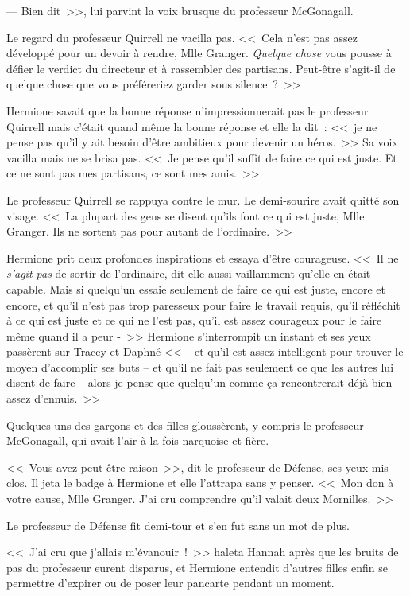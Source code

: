 --- Bien dit~>>, lui parvint la voix brusque du professeur McGonagall.

Le regard du professeur Quirrell ne vacilla pas. <<~Cela n'est pas assez développé pour un devoir à rendre, Mlle Granger. \emph{Quelque chose} vous pousse à défier le verdict du directeur et à rassembler des partisans. Peut-être s'agit-il de quelque chose que vous préféreriez garder sous silence~?~>>

Hermione savait que la bonne réponse n'impressionnerait pas le professeur Quirrell mais c'était quand même la bonne réponse et elle la dit~: <<~je ne pense pas qu'il y ait besoin d'être ambitieux pour devenir un héros.~>> Sa voix vacilla mais ne se brisa pas. <<~Je pense qu'il suffit de faire ce qui est juste. Et ce ne sont pas mes partisans, ce sont mes amis.~>>

Le professeur Quirrell se rappuya contre le mur. Le demi-sourire avait quitté son visage. <<~La plupart des gens se disent qu'ils font ce qui est juste, Mlle Granger. Ils ne sortent pas pour autant de l'ordinaire.~>>

Hermione prit deux profondes inspirations et essaya d'être courageuse. <<~Il ne \emph{s'agit pas} de sortir de l'ordinaire, dit-elle aussi vaillamment qu'elle en était capable. Mais si quelqu'un essaie seulement de faire ce qui est juste, encore et encore, et qu'il n'est pas trop paresseux pour faire le travail requis, qu'il réfléchit à ce qui est juste et ce qui ne l'est pas, qu'il est assez courageux pour le faire même quand il a peur -~>> Hermione s'interrompit un instant et ses yeux passèrent sur Tracey et Daphné <<~- et qu'il est assez intelligent pour trouver le moyen d'accomplir ses buts -- et qu'il ne fait pas seulement ce que les autres lui disent de faire -- alors je pense que quelqu'un comme ça rencontrerait déjà bien assez d'ennuis.~>>

Quelques-uns des garçons et des filles gloussèrent, y compris le professeur McGonagall, qui avait l'air à la fois narquoise et fière.

<<~Vous avez peut-être raison~>>, dit le professeur de Défense, ses yeux mis-clos. Il jeta le badge à Hermione et elle l'attrapa sans y penser. <<~Mon don à votre cause, Mlle Granger. J'ai cru comprendre qu'il valait deux Mornilles.~>>

Le professeur de Défense fit demi-tour et s'en fut sans un mot de plus.

<<~J'ai cru que j'allais m'évanouir~!~>> haleta Hannah après que les bruits de pas du professeur eurent disparus, et Hermione entendit d'autres filles enfin se permettre d'expirer ou de poser leur pancarte pendant un moment.

